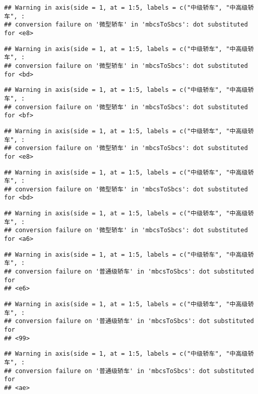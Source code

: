 \documentclass[]{article}
\begin{document}
\begin{verbatim}
## Warning in axis(side = 1, at = 1:5, labels = c("中级轿车", "中高级轿车", :
## conversion failure on '微型轿车' in 'mbcsToSbcs': dot substituted for <e8>
\end{verbatim}

\begin{verbatim}
## Warning in axis(side = 1, at = 1:5, labels = c("中级轿车", "中高级轿车", :
## conversion failure on '微型轿车' in 'mbcsToSbcs': dot substituted for <bd>
\end{verbatim}

\begin{verbatim}
## Warning in axis(side = 1, at = 1:5, labels = c("中级轿车", "中高级轿车", :
## conversion failure on '微型轿车' in 'mbcsToSbcs': dot substituted for <bf>
\end{verbatim}

\begin{verbatim}
## Warning in axis(side = 1, at = 1:5, labels = c("中级轿车", "中高级轿车", :
## conversion failure on '微型轿车' in 'mbcsToSbcs': dot substituted for <e8>
\end{verbatim}

\begin{verbatim}
## Warning in axis(side = 1, at = 1:5, labels = c("中级轿车", "中高级轿车", :
## conversion failure on '微型轿车' in 'mbcsToSbcs': dot substituted for <bd>
\end{verbatim}

\begin{verbatim}
## Warning in axis(side = 1, at = 1:5, labels = c("中级轿车", "中高级轿车", :
## conversion failure on '微型轿车' in 'mbcsToSbcs': dot substituted for <a6>
\end{verbatim}

\begin{verbatim}
## Warning in axis(side = 1, at = 1:5, labels = c("中级轿车", "中高级轿车", :
## conversion failure on '普通级轿车' in 'mbcsToSbcs': dot substituted for
## <e6>
\end{verbatim}

\begin{verbatim}
## Warning in axis(side = 1, at = 1:5, labels = c("中级轿车", "中高级轿车", :
## conversion failure on '普通级轿车' in 'mbcsToSbcs': dot substituted for
## <99>
\end{verbatim}

\begin{verbatim}
## Warning in axis(side = 1, at = 1:5, labels = c("中级轿车", "中高级轿车", :
## conversion failure on '普通级轿车' in 'mbcsToSbcs': dot substituted for
## <ae>
\end{verbatim}
\end{document}
